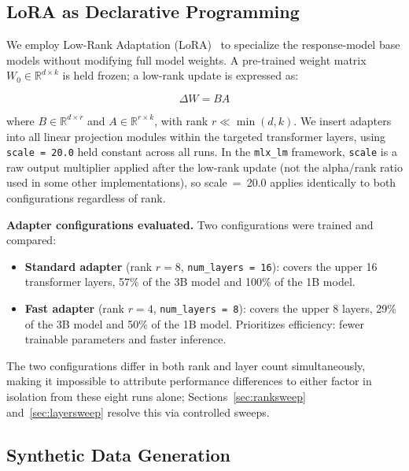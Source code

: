 \documentclass[pdflatex,sn-mathphys-num]{sn-jnl}%
\begin{document}
\subsection{LoRA as Declarative Programming}

We employ Low-Rank Adaptation (LoRA)~\cite{hu2022lora} to specialize the response-model base models without modifying full model weights. A pre-trained weight matrix $W_0 \in \mathbb{R}^{d \times k}$ is held frozen; a low-rank update is expressed as:

\begin{equation}
\Delta W = BA
\end{equation}

where $B \in \mathbb{R}^{d \times r}$ and $A \in \mathbb{R}^{r \times k}$, with rank $r \ll \min(d, k)$. We insert adapters into all linear projection modules within the targeted transformer layers, using \texttt{scale = 20.0} held constant across all runs. In the \texttt{mlx\_lm} framework, \texttt{scale} is a raw output multiplier applied after the low-rank update (not the alpha/rank ratio used in some other implementations), so scale~=~20.0 applies identically to both configurations regardless of rank.

\textbf{Adapter configurations evaluated.} Two configurations were trained and compared:
\begin{itemize}
    \item \textbf{Standard adapter} (rank $r = 8$, \texttt{num\_layers = 16}): covers the upper 16 transformer layers, 57\% of the 3B model and 100\% of the 1B model.
    \item \textbf{Fast adapter} (rank $r = 4$, \texttt{num\_layers = 8}): covers the upper 8 layers, 29\% of the 3B model and 50\% of the 1B model. Prioritizes efficiency: fewer trainable parameters and faster inference.
\end{itemize}

The two configurations differ in both rank and layer count simultaneously, making it impossible to attribute performance differences to either factor in isolation from these eight runs alone; Sections~\ref{sec:ranksweep} and~\ref{sec:layersweep} resolve this via controlled sweeps.

\subsection{Synthetic Data Generation}
\end{document}
